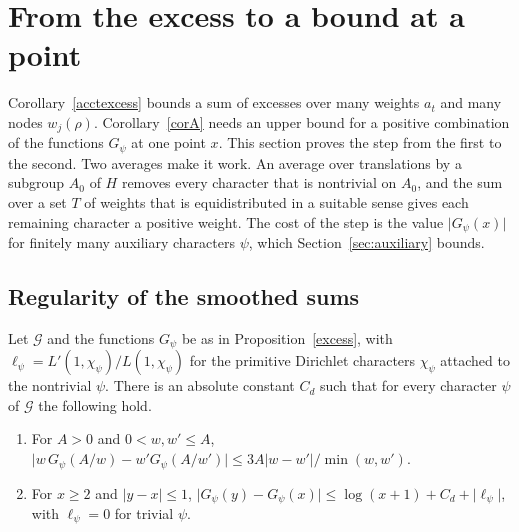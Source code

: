 \section{From the excess to a bound at a point}\label{sec:point}

Corollary~\ref{acctexcess} bounds a sum of excesses over many weights $a_t$ and many nodes $w_j(\rho)$. Corollary~\ref{corA} needs an upper bound for a positive combination of the functions $G_\psi$ at one point $x$. This section proves the step from the first to the second. Two averages make it work. An average over translations by a subgroup $A_0$ of $H$ removes every character that is nontrivial on $A_0$, and the sum over a set $T$ of weights that is equidistributed in a suitable sense gives each remaining character a positive weight. The cost of the step is the value $\lvert G_\psi(x)\rvert$ for finitely many auxiliary characters $\psi$, which Section~\ref{sec:auxiliary} bounds.

\subsection{Regularity of the smoothed sums}

\begin{lemma}\label{reg}
Let $\mathcal G$ and the functions $G_\psi$ be as in Proposition~\ref{excess}, with $\ell_\psi=L'(1,\chi_\psi)/L(1,\chi_\psi)$ for the primitive Dirichlet characters $\chi_\psi$ attached to the nontrivial $\psi$. There is an absolute constant $C_d$ such that for every character $\psi$ of $\mathcal G$ the following hold.
\begin{enumerate}
\item[(i)] For $A>0$ and $0<w,w'\le A$, $\lvert w\,G_\psi(A/w)-w'G_\psi(A/w')\rvert\le3A\lvert w-w'\rvert/\min(w,w')$.
\item[(ii)] For $x\ge2$ and $\lvert y-x\rvert\le1$, $\lvert G_\psi(y)-G_\psi(x)\rvert\le\log(x+1)+C_d+\lvert\ell_\psi\rvert$, with $\ell_\psi=0$ for trivial $\psi$.
\end{enumerate}
\end{lemma}

